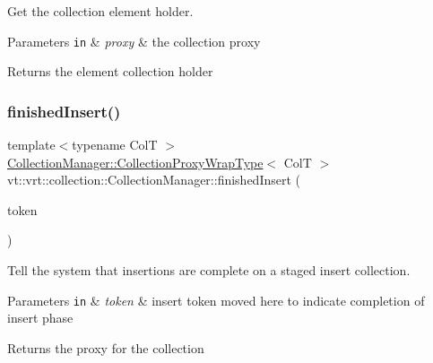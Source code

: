 Get the collection element holder. 


\begin{DoxyParams}[1]{Parameters}
\mbox{\tt in}  & {\em proxy} & the collection proxy\\
\hline
\end{DoxyParams}
\begin{DoxyReturn}{Returns}
the element collection holder 
\end{DoxyReturn}
\mbox{\label{structvt_1_1vrt_1_1collection_1_1_collection_manager_a9275a4f6a7c33389813ba7fe4cc75d7e}} 
\subsubsection{\texorpdfstring{finished\+Insert()}{finishedInsert()}}
{\footnotesize\ttfamily template$<$typename ColT $>$ \\
\hyperlink{structvt_1_1vrt_1_1collection_1_1_collection_manager_a56458ed7f9bb22b631b9b3a745f42f94}{Collection\+Manager\+::\+Collection\+Proxy\+Wrap\+Type}$<$ ColT $>$ vt\+::vrt\+::collection\+::\+Collection\+Manager\+::finished\+Insert (\begin{DoxyParamCaption}\item[{\hyperlink{structvt_1_1vrt_1_1collection_1_1_insert_token}{Insert\+Token}$<$ ColT $>$ \&\&}]{token }\end{DoxyParamCaption})}



Tell the system that insertions are complete on a staged insert collection. 


\begin{DoxyParams}[1]{Parameters}
\mbox{\tt in}  & {\em token} & insert token moved here to indicate completion of insert phase\\
\hline
\end{DoxyParams}
\begin{DoxyReturn}{Returns}
the proxy for the collection 
\end{DoxyReturn}
\mbox{\label{structvt_1_1vrt_1_1collection_1_1_collection_manager_ac59dd2227839839776c92ca0c23934e5}} 
